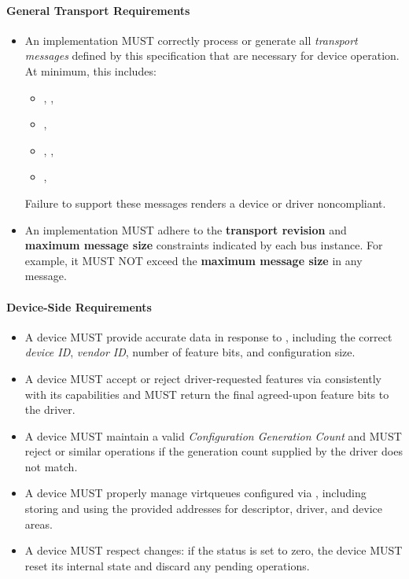\paragraph{General Transport Requirements}
\begin{itemize}
  \item An implementation MUST correctly process or generate all
    \emph{transport messages} defined by this specification that are necessary
    for device operation. At minimum, this includes:
    \begin{itemize}
      \item {}, , 
      \item {}, 
      \item {}, , 
      \item {}, 
    \end{itemize}
    Failure to support these messages renders a device or driver noncompliant.
  \item An implementation MUST adhere to the
    \textbf{transport revision} and \textbf{maximum message size} constraints
    indicated by each bus instance. For example, it MUST NOT exceed
    the \textbf{maximum message size} in any message.
\end{itemize}

\paragraph{Device-Side Requirements}
\begin{itemize}
  \item A device MUST provide accurate data in response to
    , including the correct \emph{device ID}, \emph{vendor ID},
    number of feature bits, and configuration size.
  \item A device MUST accept or reject driver-requested features via
     consistently with its capabilities and MUST
    return the final agreed-upon feature bits to the driver.
  \item A device MUST maintain a valid \emph{Configuration Generation
    Count} and MUST reject  or similar operations if
    the generation count supplied by the driver does not match.
  \item A device MUST properly manage virtqueues configured via
    , including storing and using the provided addresses for
    descriptor, driver, and device areas.
  \item A device MUST respect  changes: if the
    status is set to zero, the device MUST reset its internal state and
    discard any pending operations.
\end{itemize}

